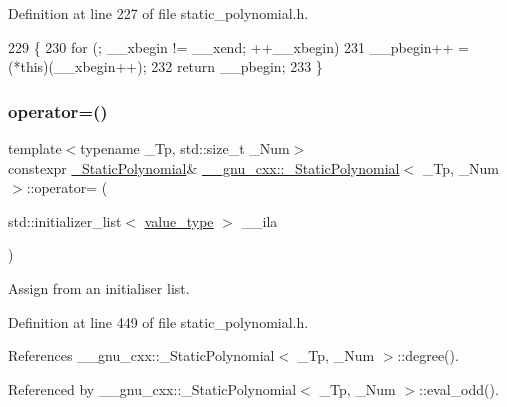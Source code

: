 Definition at line 227 of file static\+\_\+polynomial.\+h.


\begin{DoxyCode}
229         \{
230           \textcolor{keywordflow}{for} (; \_\_xbegin != \_\_xend; ++\_\_xbegin)
231             \_\_pbegin++ = (*\textcolor{keyword}{this})(\_\_xbegin++);
232           \textcolor{keywordflow}{return} \_\_pbegin;
233         \}
\end{DoxyCode}
\mbox{\label{class____gnu__cxx_1_1__StaticPolynomial_a71b8d7733a5774a997fb22aac63868f1}} 
\subsubsection{\texorpdfstring{operator=()}{operator=()}}
{\footnotesize\ttfamily template$<$typename \+\_\+\+Tp, std\+::size\+\_\+t \+\_\+\+Num$>$ \\
constexpr \hyperlink{class____gnu__cxx_1_1__StaticPolynomial}{\+\_\+\+Static\+Polynomial}\& \hyperlink{class____gnu__cxx_1_1__StaticPolynomial}{\+\_\+\+\_\+gnu\+\_\+cxx\+::\+\_\+\+Static\+Polynomial}$<$ \+\_\+\+Tp, \+\_\+\+Num $>$\+::operator= (\begin{DoxyParamCaption}\item[{std\+::initializer\+\_\+list$<$ \hyperlink{class____gnu__cxx_1_1__StaticPolynomial_af23110f5a002cd6caa3542df7cf35284}{value\+\_\+type} $>$}]{\+\_\+\+\_\+ila }\end{DoxyParamCaption})\hspace{0.3cm}{\ttfamily [inline]}}

Assign from an initialiser list. 

Definition at line 449 of file static\+\_\+polynomial.\+h.



References \+\_\+\+\_\+gnu\+\_\+cxx\+::\+\_\+\+Static\+Polynomial$<$ \+\_\+\+Tp, \+\_\+\+Num $>$\+::degree().



Referenced by \+\_\+\+\_\+gnu\+\_\+cxx\+::\+\_\+\+Static\+Polynomial$<$ \+\_\+\+Tp, \+\_\+\+Num $>$\+::eval\+\_\+odd().


